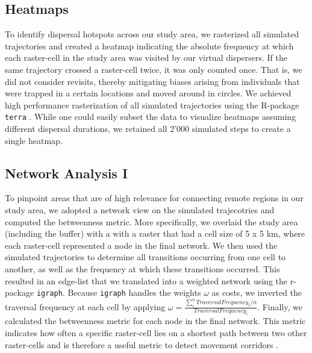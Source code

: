 \documentclass[abstract=on,10pt,a4paper,bibliography=totocnumbered]{article}
\begin{document}
\subsection{Heatmaps}
To identify dispersal hotspots across our study area, we rasterized all
simulated trajectories and created a heatmap indicating the absolute frequency
at which each raster-cell in the study area was visited by our virtual
dispersers. If the same trajectory crossed a raster-cell twice, it was only
counted once. That is, we did not consider revisits, thereby mitigating biases
arising from individuals that were trapped in a certain locations and moved
around in circles. We achieved high performance rasterization of all simulated
trajectories using the R-package {\tt terra} \citep{Hijmans.2020}. While one
could easily subset the data to visualize heatmaps assuming different dispersal
durations, we retained all 2'000 simulated steps to create a single heatmap.



\subsection{Network Analysis I}
To pinpoint areas that are of high relevance for connecting remote regions in
our study area, we adopted a network view on the simulated trajecotries and
computed the betweenness metric. More specifically, we overlaid the study area
(including the buffer) with a with a raster that had a cell size of 5 x 5 km,
where each raster-cell represented a node in the final network. We then used the
simulated trajectories to determine all transitions occurring from one cell to
another, as well as the frequency at which these transitions occurred. This
resulted in an edge-list that we translated into a weighted network using the
r-package {\tt igraph}. Because {\tt igraph} handles the weights \(\omega\) as
costs, we inverted the traversal frequency at each cell by applying \(\omega =
\frac{\sum_i^n{Traversal Frequency_i}/n}{Traversal Frequency_i}\). Finally, we
calculated the betweenness metric for each node in the final network. This
metric indicates how often a specific raster-cell lies on a shortest path
between two other raster-cells and is therefore a useful metric to detect
movement corridors \citep{BastilleRousseau.2018}.
\end{document}
